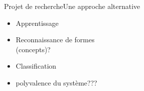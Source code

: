 \begin{frame}{Projet de recherche}{Une approche alternative}
\begin{itemize}
\item Apprentissage
\item Reconnaissance de formes\\
  (concepts)?
\item Classification
\item polyvalence du système???
\end{itemize}

\end{frame}
